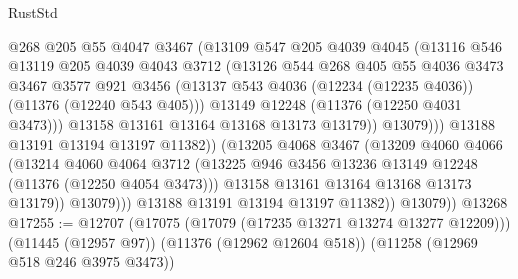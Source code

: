 \begin{lexlean}{RustStd}
\begin{coremodule}
{{{{{{{{{{{{{{{{{{{                          @268
                          @205
                          @55
                          @4047
                          @3467
                          (@13109
                            @547
                            @205
                            @4039
                            @4045
                            (@13116
                              @546
                              @13119
                              @205
                              @4039
                              @4043
                              @3712
                              (@13126
                                @544
                                @268
                                @405
                                @55
                                @4036
                                @3473
                                @3467
                                @3577
                                @921
                                @3456
                                (@13137
                                  @543
                                  @4036
                                  (@12234 (@12235 @4036))
                                  (@11376 (@12240 @543 @405)))
                                @13149
                                @12248
                                (@11376 (@12250 @4031 @3473)))
                              @13158
                              @13161
                              @13164
                              @13168
                              @13173
                              @13179))
                          @13079)))
                    @13188
                    @13191
                    @13194
                    @13197
                    @11382))
                (@13205
                  @4068
                  @3467
                  (@13209
                    @4060
                    @4066
                    (@13214
                      @4060
                      @4064
                      @3712
                      (@13225 @946 @3456 @13236 @13149 @12248 (@11376 (@12250 @4054 @3473)))
                      @13158
                      @13161
                      @13164
                      @13168
                      @13173
                      @13179))
                  @13079)))
            @13188
            @13191
            @13194
            @13197
            @11382))
        @13079))
    @13268
@17255 := @12707
    (@17075 (@17079 (@17235 @13271 @13274 @13277 @12209)))
    (@11445 (@12957 @97))
    (@11376 (@12962 @12604 @518))
    (@11258 (@12969 @518 @246 @3975 @3473))
}}}}}}}}}}}}}}}}}}}
\end{coremodule}
\end{lexlean}
